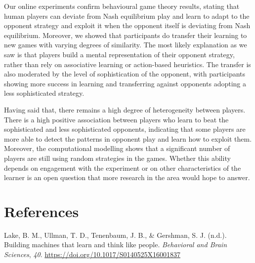 \documentclass[man,floatsintext]{apa6}
\begin{document}
Our online experiments confirm behavioural game theory results, stating that human players can deviate from Nash equilibrium play and learn to adapt to the opponent strategy and exploit it when the opponent itself is deviating from Nash equilibrium. Moreover, we showed that participants do transfer their learning to new games with varying degrees of similarity. The most likely explanation as we saw is that players build a mental representation of their opponent strategy, rather than rely on associative learning or action-based heuristics. The transfer is also moderated by the level of sophistication of the opponent, with participants showing more success in learning and transferring against opponents adopting a less sophisticated strategy.

Having said that, there remains a high degree of heterogeneity between players. There is a high positive association between players who learn to beat the sophisticated and less sophisticated opponents, indicating that some players are more able to detect the patterns in opponent play and learn how to exploit them. Moreover, the computational modelling shows that a significant number of players are still using random strategies in the games. Whether this ability depends on engagement with the experiment or on other characteristics of the learner is an open question that more research in the area would hope to answer.

\newpage

\hypertarget{references}{%
\section{References}\label{references}}

\begingroup
\setlength{\parindent}{-0.5in}
\setlength{\leftskip}{0.5in}

\hypertarget{refs}{}
\leavevmode\hypertarget{ref-lakeBuildingMachinesThat2017}{}%
Lake, B. M., Ullman, T. D., Tenenbaum, J. B., \& Gershman, S. J. (n.d.). Building machines that learn and think like people. \emph{Behavioral and Brain Sciences}, \emph{40}. \url{https://doi.org/10.1017/S0140525X16001837}

\endgroup
\end{document}
